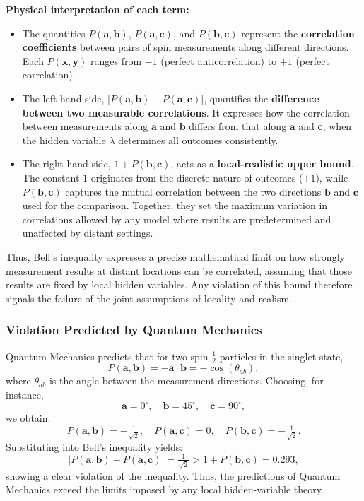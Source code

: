 \vspace{0.4em}
\noindent
\textbf{Physical interpretation of each term:}
\begin{itemize}
    \item The quantities $P(\mathbf{a},\mathbf{b})$, $P(\mathbf{a},\mathbf{c})$, and $P(\mathbf{b},\mathbf{c})$ represent the \textbf{correlation coefficients} between pairs of spin measurements along different directions.  
    Each $P(\mathbf{x},\mathbf{y})$ ranges from $-1$ (perfect anticorrelation) to $+1$ (perfect correlation).
    
    \item The left-hand side, $|P(\mathbf{a},\mathbf{b}) - P(\mathbf{a},\mathbf{c})|$, quantifies the \textbf{difference between two measurable correlations}.  
    It expresses how the correlation between measurements along $\mathbf{a}$ and $\mathbf{b}$ differs from that along $\mathbf{a}$ and $\mathbf{c}$, when the hidden variable $\lambda$ determines all outcomes consistently.
    
    \item The right-hand side, $1 + P(\mathbf{b},\mathbf{c})$, acts as a \textbf{local-realistic upper bound}.  
    The constant $1$ originates from the discrete nature of outcomes ($\pm 1$), while $P(\mathbf{b},\mathbf{c})$ captures the mutual correlation between the two directions $\mathbf{b}$ and $\mathbf{c}$ used for the comparison.  
    Together, they set the maximum variation in correlations allowed by any model where results are predetermined and unaffected by distant settings.
\end{itemize}

\vspace{0.4em}
\noindent
Thus, Bell’s inequality expresses a precise mathematical limit on how strongly measurement results at distant locations can be correlated, assuming that those results are fixed by local hidden variables.  
Any violation of this bound therefore signals the failure of the joint assumptions of locality and realism.

\subsubsection{Violation Predicted by Quantum Mechanics}

Quantum Mechanics predicts that for two spin-$\tfrac{1}{2}$ particles in the singlet state,
\[
P(\mathbf{a},\mathbf{b}) = -\mathbf{a}\cdot\mathbf{b} = -\cos(\theta_{ab}),
\]
where $\theta_{ab}$ is the angle between the measurement directions.  
Choosing, for instance,
\[
\mathbf{a} = 0^\circ, \quad \mathbf{b} = 45^\circ, \quad \mathbf{c} = 90^\circ,
\]
we obtain:
\[
P(\mathbf{a},\mathbf{b}) = -\tfrac{1}{\sqrt{2}}, \quad
P(\mathbf{a},\mathbf{c}) = 0, \quad
P(\mathbf{b},\mathbf{c}) = -\tfrac{1}{\sqrt{2}}.
\]
Substituting into Bell’s inequality yields:
\[
|P(\mathbf{a},\mathbf{b}) - P(\mathbf{a},\mathbf{c})| = \tfrac{1}{\sqrt{2}} > 1 + P(\mathbf{b},\mathbf{c}) = 0.293,
\]
showing a clear violation of the inequality.  
Thus, the predictions of Quantum Mechanics exceed the limits imposed by any local hidden-variable theory.

